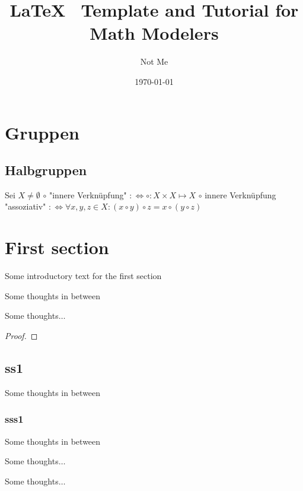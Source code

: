 \documentclass[8pt]{article}   %
\title{LaTeX \, Template and Tutorial for Math Modelers}
\author{Not Me}
\date{\today}
\begin{document}
\tableofcontents
\newpage

\section{Gruppen}

\subsection{Halbgruppen}

\begin{definition}
	Sei $X \neq \emptyset$ \newline
	$\circ$ "innere Verknüpfung" $:\iff \circ: X \times X \mapsto X$ \newline
	$\circ$ innere Verknüpfung "assoziativ" $:\iff \forall x,y,z \in X: (x \circ y) \circ z = x \circ (y \circ z)$

\end{definition}


\section{First section}
Some introductory text for the first section

Some thoughts in between

\begin{theorem}[Text]
Some thoughts$\ldots$ \label{alg:first}
\end{theorem}

\begin{proof}
\end{proof}

\subsection{ss1}
Some thoughts in between

\subsubsection{sss1}
Some thoughts in between

\begin{lemma}
Some thoughts$\ldots$ \label{alg:first}
\end{lemma}

\begin{definition}
Some thoughts$\ldots$ \label{alg:first}
\end{definition}
\end{document}
